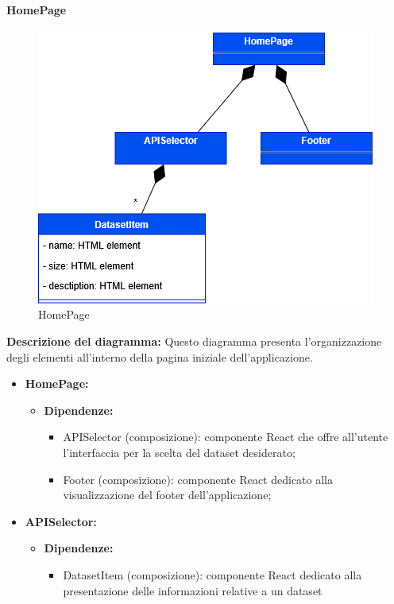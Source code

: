 \paragraph{HomePage}
\begin{figure}[h!] \centering
    \includegraphics[scale=0.45]{template/images/uml_front/ui/homepage.png}
    \caption{HomePage}
\end{figure}
\textbf{Descrizione del diagramma:}
Questo diagramma presenta l'organizzazione degli elementi all'interno della pagina iniziale dell'applicazione.
\begin{itemize}
    \item \textbf{HomePage:}
          \begin{itemize}
              \item \textbf{Dipendenze:}
                    \begin{itemize}
                        \item APISelector (composizione): componente React che offre all'utente l'interfaccia
                              per la scelta del dataset desiderato;
                        \item Footer (composizione): componente React dedicato alla visualizzazione del
                              footer dell'applicazione;
                    \end{itemize}
          \end{itemize}

    \item \textbf{APISelector:}
          \begin{itemize}
              \item \textbf{Dipendenze:}
                    \begin{itemize}
                        \item DatasetItem (composizione): componente React dedicato alla presentazione delle
                              informazioni relative a un dataset
                    \end{itemize}
          \end{itemize}
\end{itemize}

